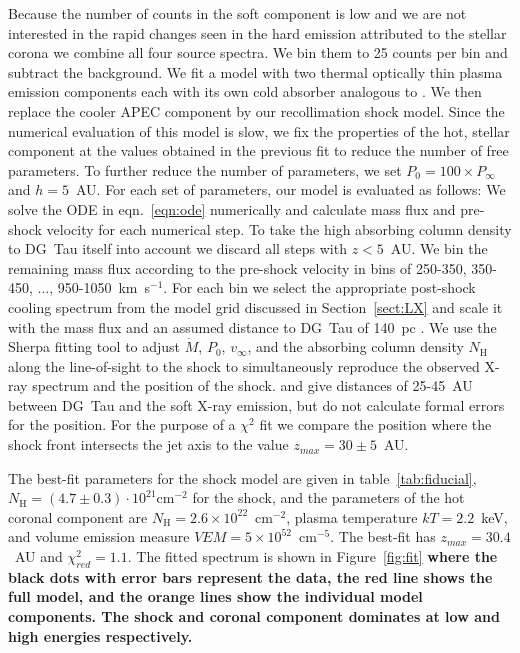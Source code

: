 \documentclass[manuscript]{aastex}
\begin{document}
Because the number of counts in the soft component is low and we are not interested in the rapid changes seen in the hard emission attributed to the stellar corona \citep{2008A&A...478..797G} we combine all four source spectra. We bin them to 25 counts per bin and subtract the background. We fit a model with two thermal optically thin plasma emission components \citep[APEC,][]{2012ApJ...756..128F} each with its own cold absorber analogous to \citet{2008A&A...478..797G}. We then replace the cooler APEC component by our recollimation shock model. Since the numerical evaluation of this model is slow, we fix the properties of the hot, stellar component at the values obtained in the previous fit to reduce the number of free parameters. To further reduce the number of parameters, we set $P_0 = 100\times P_\infty$ and $h=5$~AU. For each set of parameters, our model is evaluated as follows: We solve the ODE in eqn.~\ref{eqn:ode} numerically and calculate mass flux and pre-shock velocity for each numerical step. To take the high absorbing column density to DG~Tau itself into account we discard all steps with $z<5$~AU. We bin the remaining mass flux according to the pre-shock velocity in bins of 250-350, 350-450, ..., 950-1050~km~s$^{-1}$. For each bin we select the appropriate post-shock cooling spectrum from the model grid discussed in Section~\ref{sect:LX} and scale it with the mass flux and an assumed distance to DG~Tau of 140~pc \citep{1994AJ....108.1872K}. We use the Sherpa fitting tool \citep{2001SPIE.4477...76F} to adjust $\dot M$, $P_0$, $v_\infty$, and the absorbing column density $N_\textrm{H}$ along the line-of-sight to the shock to simultaneously reproduce the observed X-ray spectrum and the position of the shock. \citet{2008A&A...488L..13S} and \citet{2011ASPC..448..617G} give distances of 25-45~AU between DG~Tau and the soft X-ray emission, but do not calculate formal errors for the position. For the purpose of a $\chi^2$ fit we compare the position where the shock front intersects the jet axis to the value $z_{max} = 30\pm5$~AU.

The best-fit parameters for the shock model are given in table~\ref{tab:fiducial}, $N_\textrm{H}=(4.7\pm0.3)\cdot10^{21}\mathrm{ cm}^{-2}$ for the shock, and the parameters of the hot coronal component are $N_\textrm{H}=2.6\times10^{22}$~cm$^{-2}$, plasma temperature $kT = 2.2$~keV, and volume emission measure $VEM=5\times10^{52}$~cm$^{-5}$. The best-fit has $z_{max} = 30.4$~AU and $\chi^2_{red}= 1.1$. The fitted spectrum is shown in Figure~\ref{fig:fit} \textbf{where the black dots with error bars represent the data, the red line shows the full model, and the orange lines show the individual model components. The shock and coronal component dominates at low and high energies respectively.}
\end{document}
